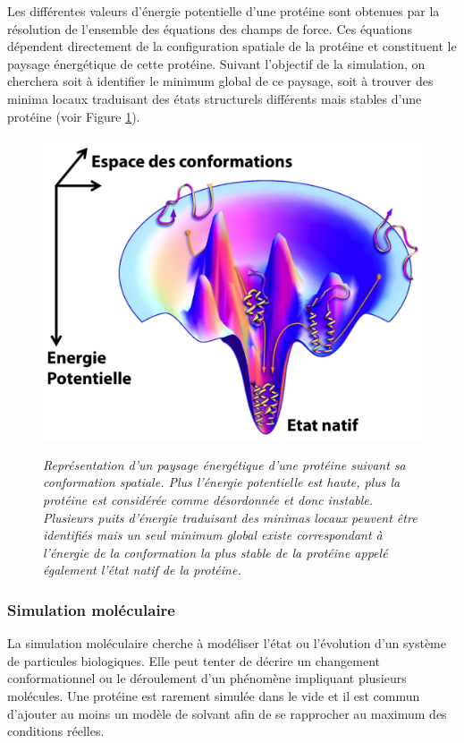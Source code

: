 
Les différentes valeurs d'énergie potentielle d'une protéine sont obtenues par la résolution de l'ensemble des équations des champs de force. Ces équations dépendent directement de la configuration spatiale de la protéine et constituent le paysage énergétique de cette protéine. Suivant l’objectif de la simulation, on cherchera soit à identifier le minimum global de ce paysage, soit à trouver des minima locaux traduisant des états structurels différents mais stables d'une protéine (voir Figure \ref{Fig:energy_landscape_edit}).


\begin{figure}
  \centering
  {\includegraphics[width=0.65\linewidth]{./figures/ch1/energy_landscape_edit.png}}
    \caption{\it Représentation d'un paysage énergétique d'une protéine suivant sa conformation spatiale. Plus l'énergie potentielle est haute, plus la protéine est considérée comme désordonnée et donc instable. Plusieurs puits d'énergie traduisant des minimas locaux peuvent être identifiés mais un seul minimum global existe correspondant à l'énergie de la conformation la plus stable de la protéine appelé également l'état natif de la protéine.}
    \label{Fig:energy_landscape_edit}
  \hspace{0.2cm}
\end{figure}
 

\subsubsection{Simulation moléculaire} \label{simu}


La simulation moléculaire cherche à modéliser l'état ou l'évolution d'un système de particules biologiques. Elle peut tenter de décrire un changement conformationnel ou le déroulement d'un phénomène impliquant plusieurs molécules.
Une protéine est rarement simulée dans le vide et il est commun d'ajouter au moins un modèle de solvant afin de se rapprocher au maximum des conditions réelles.

